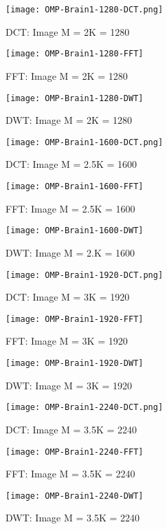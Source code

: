 \documentclass[titlepage,oneside, 12pt]{book}
\theoremstyle{break}
\begin{document}
\clearpage
\begin{figure}[!h]
\centering
{}
  \texttt{[image: OMP-Brain1-1280-DCT.png]}
  \caption{DCT: Image M = 2K = 1280}\label{fig:OMP-Brain1-1280-DCT}
\endminipage
\hspace*{2em}
  \texttt{[image: OMP-Brain1-1280-FFT]}
  \caption{FFT: Image M = 2K = 1280}\label{fig:OMP-Brain1-1280-FFT}
\endminipage
\hspace*{2em}
%
  \texttt{[image: OMP-Brain1-1280-DWT]}
  \caption{DWT: Image M = 2K = 1280}\label{fig:OMP-Brain1-1280-DWT}
\endminipage
\hspace*{2em}
\end{figure}

\begin{figure}[!h]
\centering
{}
  \texttt{[image: OMP-Brain1-1600-DCT.png]}
  \caption{DCT: Image M = 2.5K = 1600}\label{fig:OMP-Brain1-1600-DCT}
\endminipage
\hspace*{2em}
  \texttt{[image: OMP-Brain1-1600-FFT]}
  \caption{FFT: Image M = 2.5K = 1600}\label{fig:OMP-Brain1-1600-FFT}
\endminipage
\hspace*{2em}
%
  \texttt{[image: OMP-Brain1-1600-DWT]}
  \caption{DWT: Image M = 2.K = 1600}\label{fig:OMP-Brain1-1600-DWT}
\endminipage
\hspace*{2em}
\end{figure}

\begin{figure}[!h]
\centering
{}
  \texttt{[image: OMP-Brain1-1920-DCT.png]}
  \caption{DCT: Image M = 3K = 1920}\label{fig:OMP-Brain1-1920-DCT}
\endminipage
\hspace*{2em}
  \texttt{[image: OMP-Brain1-1920-FFT]}
  \caption{FFT: Image M = 3K = 1920}\label{fig:OMP-Brain1-1920-FFT}
\endminipage
\hspace*{2em}
%
  \texttt{[image: OMP-Brain1-1920-DWT]}
  \caption{DWT: Image M = 3K = 1920}\label{fig:OMP-Brain1-1920-DWT}
\endminipage
\hspace*{2em}
\end{figure}

\clearpage

\begin{figure}[!h]
\centering
{}
  \texttt{[image: OMP-Brain1-2240-DCT.png]}
  \caption{DCT: Image M = 3.5K = 2240}\label{fig:OMP-Brain1-2240-DCT}
\endminipage
\hspace*{2em}
  \texttt{[image: OMP-Brain1-2240-FFT]}
  \caption{FFT: Image M = 3.5K = 2240}\label{fig:OMP-Brain1-2240-FFT}
\endminipage
\hspace*{2em}
%
  \texttt{[image: OMP-Brain1-2240-DWT]}
  \caption{DWT: Image M = 3.5K = 2240}\label{fig:OMP-Brain1-2240-DWT}
\endminipage
\hspace*{2em}
\end{figure}
\end{document}
